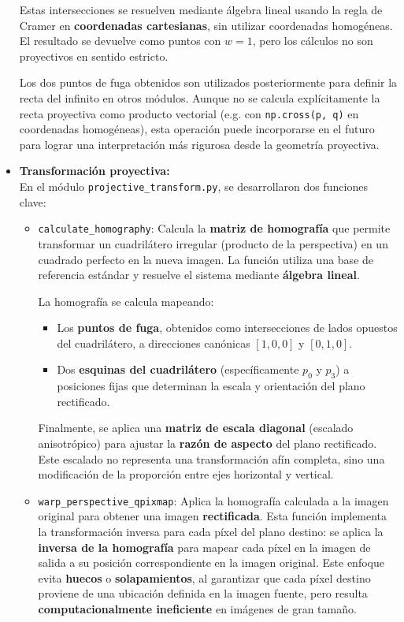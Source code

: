 \begin{itemize}
    Estas intersecciones se resuelven mediante álgebra lineal usando la regla de Cramer en \textbf{coordenadas cartesianas}, sin utilizar coordenadas homogéneas. El resultado se devuelve como puntos con $w = 1$, pero los cálculos no son proyectivos en sentido estricto.
        
    Los dos puntos de fuga obtenidos son utilizados posteriormente para definir la recta del infinito en otros módulos. Aunque no se calcula explícitamente la recta proyectiva como producto vectorial (e.g. con \texttt{np.cross(p, q)} en coordenadas homogéneas), esta operación puede incorporarse en el futuro para lograr una interpretación más rigurosa desde la geometría proyectiva.
    
    
    \item \textbf{Transformación proyectiva:} \\
    En el módulo \texttt{projective\_transform.py}, se desarrollaron dos funciones clave:

    \begin{itemize}
        \item \texttt{calculate\_homography}: Calcula la \textbf{matriz de homografía} que permite transformar un cuadrilátero irregular (producto de la perspectiva) en un cuadrado perfecto en la nueva imagen. La función utiliza una base de referencia estándar y resuelve el sistema mediante \textbf{álgebra lineal}.
        
        La homografía se calcula mapeando:
        \begin{itemize}
            \item Los \textbf{puntos de fuga}, obtenidos como intersecciones de lados opuestos del cuadrilátero, a direcciones canónicas \([1, 0, 0]\) y \([0, 1, 0]\).
            \item Dos \textbf{esquinas del cuadrilátero} (específicamente \(p_0\) y \(p_3\)) a posiciones fijas que determinan la escala y orientación del plano rectificado.
        \end{itemize}
        Finalmente, se aplica una \textbf{matriz de escala diagonal} (escalado anisotrópico) para ajustar la \textbf{razón de aspecto} del plano rectificado. Este escalado no representa una transformación afín completa, sino una modificación de la proporción entre ejes horizontal y vertical.
    
        \item \texttt{warp\_perspective\_qpixmap}: Aplica la homografía calculada a la imagen original para obtener una imagen \textbf{rectificada}. Esta función implementa la transformación inversa para cada píxel del plano destino: se aplica la \textbf{inversa de la homografía} para mapear cada píxel en la imagen de salida a su posición correspondiente en la imagen original. Este enfoque evita \textbf{huecos} o \textbf{solapamientos}, al garantizar que cada píxel destino proviene de una ubicación definida en la imagen fuente, pero resulta \textbf{computacionalmente ineficiente} en imágenes de gran tamaño.
    \end{itemize}
    

\end{itemize}
